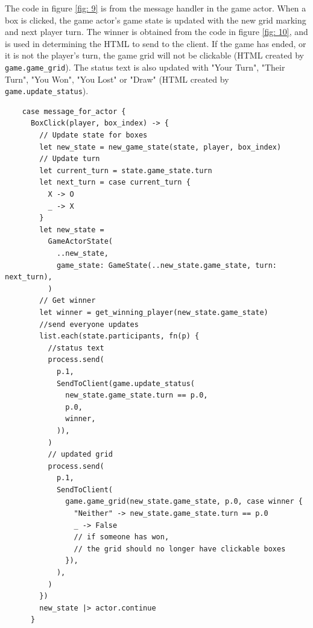 \documentclass[]{interim}
\begin{document}
\begin{minipage}[t]{18em}

  The code in figure \ref{fig: 9} is from the message handler in the game actor.
  When a box is clicked, the game actor's game state is updated with the new
  grid marking and next player turn. The winner is obtained from the code in
  figure \ref{fig: 10}, and is used in determining the HTML to send to the client.
  If the game has ended, or it is not the player's turn, the game grid will not be
  clickable (HTML created by \texttt{game.game\_grid}). The status text is also
  updated with "Your Turn", "Their Turn", "You Won",
  "You Lost" or "Draw" (HTML created by \texttt{game.update\_status}).

\end{minipage}
\hfill
\begin{minipage}[t]{20em}
  \begin{lstlisting}
    case message_for_actor {
      BoxClick(player, box_index) -> {
        // Update state for boxes
        let new_state = new_game_state(state, player, box_index)
        // Update turn
        let current_turn = state.game_state.turn
        let next_turn = case current_turn {
          X -> O
          _ -> X
        }
        let new_state =
          GameActorState(
            ..new_state,
            game_state: GameState(..new_state.game_state, turn: next_turn),
          )
        // Get winner
        let winner = get_winning_player(new_state.game_state)
        //send everyone updates
        list.each(state.participants, fn(p) {
          //status text
          process.send(
            p.1,
            SendToClient(game.update_status(
              new_state.game_state.turn == p.0,
              p.0,
              winner,
            )),
          )
          // updated grid
          process.send(
            p.1,
            SendToClient(
              game.game_grid(new_state.game_state, p.0, case winner {
                "Neither" -> new_state.game_state.turn == p.0
                _ -> False
                // if someone has won,
                // the grid should no longer have clickable boxes
              }),
            ),
          )
        })
        new_state |> actor.continue
      }
  \end{lstlisting}
  \label{fig: 9}
\end{minipage}

\newpage
\end{document}
